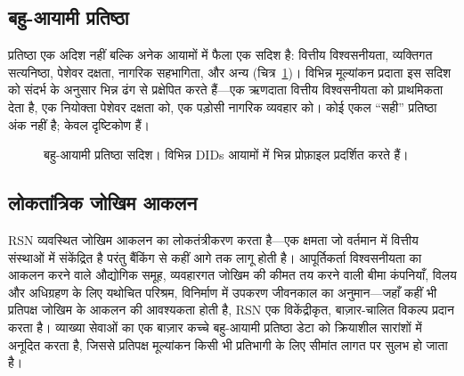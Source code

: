 \documentclass[11pt,a4paper,twocolumn]{article}
\begin{document}
\subsection{बहु-आयामी प्रतिष्ठा}

प्रतिष्ठा एक अदिश नहीं बल्कि अनेक आयामों में फैला एक सदिश है: वित्तीय विश्वसनीयता, व्यक्तिगत सत्यनिष्ठा, पेशेवर दक्षता, नागरिक सहभागिता, और अन्य (चित्र~\ref{fig:reputation-radar})। विभिन्न मूल्यांकन प्रदाता इस सदिश को संदर्भ के अनुसार भिन्न ढंग से प्रक्षेपित करते हैं---एक ऋणदाता वित्तीय विश्वसनीयता को प्राथमिकता देता है, एक नियोक्ता पेशेवर दक्षता को, एक पड़ोसी नागरिक व्यवहार को। कोई एकल ``सही'' प्रतिष्ठा अंक नहीं है; केवल दृष्टिकोण हैं।

\begin{figure}[ht]
\centering
{}
\caption{बहु-आयामी प्रतिष्ठा सदिश। विभिन्न DIDs आयामों में भिन्न प्रोफ़ाइल प्रदर्शित करते हैं।}
\label{fig:reputation-radar}
\end{figure}

\subsection{लोकतांत्रिक जोखिम आकलन}

RSN व्यवस्थित जोखिम आकलन का लोकतंत्रीकरण करता है---एक क्षमता जो वर्तमान में वित्तीय संस्थाओं में संकेंद्रित है परंतु बैंकिंग से कहीं आगे तक लागू होती है। आपूर्तिकर्ता विश्वसनीयता का आकलन करने वाले औद्योगिक समूह, व्यवहारगत जोखिम की कीमत तय करने वाली बीमा कंपनियाँ, विलय और अधिग्रहण के लिए यथोचित परिश्रम, विनिर्माण में उपकरण जीवनकाल का अनुमान---जहाँ कहीं भी प्रतिपक्ष जोखिम के आकलन की आवश्यकता होती है, RSN एक विकेंद्रीकृत, बाज़ार-चालित विकल्प प्रदान करता है। व्याख्या सेवाओं का एक बाज़ार कच्चे बहु-आयामी प्रतिष्ठा डेटा को क्रियाशील सारांशों में अनूदित करता है, जिससे प्रतिपक्ष मूल्यांकन किसी भी प्रतिभागी के लिए सीमांत लागत पर सुलभ हो जाता है।

\end{document}
